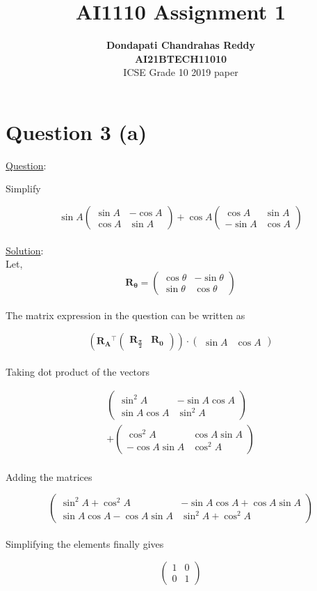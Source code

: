 \documentclass[journal,12pt,twocolumn]{IEEEtran}
\newcommand{\myvec}[1]{\ensuremath{\begin{pmatrix}#1\end{pmatrix}}}
\let\vec\mathbf
\begin{document}
\title{\textbf{AI1110 Assignment 1} }
\author{\textbf{Dondapati Chandrahas Reddy}\\ \textbf{AI21BTECH11010}\\ ICSE Grade 10 2019 paper}

\maketitle

{\section {Question 3 (a) \newline}}

{\large \underline{Question}:\newline}

Simplify

\begin{equation}
	\sin A\myvec{\sin A &  -\cos A \\ \cos A & \sin A} + \cos A \myvec{\cos A &  \sin A \\ -\sin A & \cos A}
\end{equation}\\

{\large \underline{Solution}:}\\

Let,
\begin{equation}
	\vec{R_\theta} = \myvec{\cos \theta &  -\sin \theta \\ \sin \theta & \cos \theta}
\end{equation}\\

The matrix expression in the question can be written as

\begin{equation}
	\left(\vec{R_A}\!^\top \myvec{\vec{R_{\frac{\pi}{2}}} & \vec{R_0}}\right) \cdot \myvec{\sin A & \cos A}
\end{equation}\\

Taking dot product of the vectors

\begin{multline}
	\myvec{\sin^2 A &  -\sin A\cos A \\ \sin A\cos A & \sin^2 A} \\ 
	+ \myvec{\cos^2 A & \cos A\sin A \\ -\cos A\sin A & \cos^2 A}
\end{multline}\\

Adding the matrices

\begin{equation}
	\myvec{\sin^2 A + \cos^2 A &  -\sin A \cos A +\cos A \sin A \\ \sin A \cos A -\cos A \sin A & \sin^2 A + \cos^2 A}
\end{equation}\\

Simplifying the elements finally gives

\begin{equation}
	\myvec{1 & 0 \\ 0 & 1}
\end{equation}\\
\end{document}
